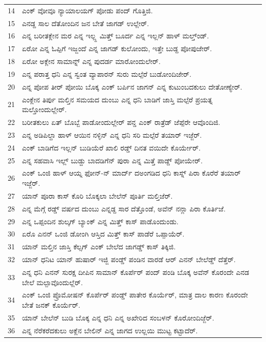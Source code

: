 \documentclass[11pt]{article}
\begin{document}
\begin{longtable}{p{} >{\kannadafont}p{}}
14 & ಎಂಕ್ ವೋವೂ ನ್ಯಾಯಾಲಯಗ್ ಪೋಡು ಪಂದ್ ಗೊತ್ತಿಜಿ. \\
15 & ಎನಡ್ದ ಸಾಲ ದೆತೋಂದಿನ ಜನ ಬೇತೆ ಜಾಗಡ್ ಉಲ್ಲೇರ್. \\
16 & ಎನ್ನ ಬರೀತಕ್ಲೇನ ಮರ ಎನ್ನ ಇಲ್ಲ್ದ ಮಿತ್ತ್ ಬೂರ್ದ ಎನ್ನ ಇಲ್ಲನ್ ಹಾಳ್ ಮಲ್ತ್ಂಡ್. \\
17 & ಏರೋ ಎನ್ನ ಓಪ್ಪಿಗೆ ಇಜ್ಜಂದೆ ಎನ್ನ ಜಾಗಡ್ ಕುಲೋಂದು, ಇತ್ತೇ ಬುಡ್ದ ಪೋಪುಜೇರ್. \\
18 & ಏರೋ ಅಕ್ಲೇನ ಸಾಮಾನ್ನ್ ಎನ್ನ ಪುದರ್ಡ ಮಾರೋಂದುಲೇರ್. \\
19 & ಎನ್ನ ಪರಾತ್ತ ಧನಿ ಎನ್ನ ಸ್ವಂತ ವ್ಯಾಪಾರನ್ ಸುರು ಮಲ್ಪೆರೆ ಬುಡೋಂದಿಜೇರ್. \\
20 & ಎನ್ನ ಪೋಪ ತೀರ್ ಪೋಯಿ ಬೊಕ್ಕ ಎಂಕ್ ಬರ್ಪಿನ ಜಾಗನ್ ಎನ್ನ ಕುಟುಂಬದಕುಲು ದೇತೋಣ್ಯೇರ್. \\
21 & ಎಂಕ್ಲೇನ ತಿರ್ಪು ಮಲ್ತಿನ ಸಮಯದ ದುಂಬು ಎನ್ನ ಧನಿ ಬಾಡಿಗೆ ಜಾಸ್ತಿ ಮಲ್ಪೆರೆ ಪ್ರಯತ್ನ ಮಲ್ತೋಂದುಲ್ಲೇರ್. \\
22 & ಬರೀತಕುಲು ಏತ್ ಬೊಬ್ಬೆ ಪಾಡೋಂದುಲ್ಲೇರ್ ಪನ್ಡ ಎಂಕ್ ರಾತ್ರೆಡ್ ಜೆಪ್ಪೆರೇ ಆವೊಂದಿಜಿ. \\
23 & ಎನ್ನ ಅಡಿಪಿಲ್ದಾ ಹಾಳ್ ಆಯಿನ ನಳ್ಳಿನ್ ಎನ್ನ ಧನಿ ಸರಿ ಮಲ್ಪೆರೆ ತಯಾರ್ ಇಜ್ಜೆರ್. \\
24 & ಎಂಕ್ ಬಾಡಿಗೆದ ಇಲ್ಲನ್ ಬುಡಿಯೆರೆ ಖಾಲಿ ರಡ್ಡ್ ದಿನತ ವಯಿದೇ ಕೊರ್ಯೇರ್. \\
25 & ಎನ್ನ ಸಹವಾಸಿ ಇಲ್ಲ್ ಬುಡ್ದು ಬಾದಡಿಗೆನ್ ಪುರಾ ಎನ್ನ ಮಿತ್ತೆ ಪಾಡ್ದ್ ಪೋಯೇರ್. \\
26 & ಎಂಕ್ ಒಂಜಿ ಹಾಳ್ ಆಯ್ನ ಫೋನ್-ನ್ ಮಾರ್ದ್ ದಅಂಗಡಿದ ಧನಿ ಕಾಸ್ನ್ ಪಿರಾ ಕೊರೆರೆ ತಯಾರ್ ಇಜ್ಜೆರ್. \\
27 & ಯಾನ್ ಪೂರಾ ಕಾಸ್ ಕೊರಿ ಬೊಕ್ಕಲಾ ಬೇಲೆನ್ ಪೂರ್ತಿ ಮಲ್ತಿಜೆರ್. \\
28 & ಎನ್ನ ಮೆಗ್ಗೆ ರಡ್ಡ್ ವರ್ಷದ ದುಂಬು ಎನ್ನಡ್ದ ಸಾರ ದೆತ್ತೊಂಡೆ, ಅವೆನ್ ನನ್ಲಾ ಪಿರಾ ಕೊರ್ತಿಜೆ. \\
29 & ಎನ್ನ ಒಪ್ಪಂದಿನ ಶುಲ್ಕಗ್ ಬ್ಯಾಂಕ್ ಎನ್ನ ಮಿತ್ತ್ ಕಾಸ್ ಪಾಡೊಂದುಂಡು. \\
30 & ಏರೊ ಎನನ್ ಒಂಜಿ ಡೋಂಗಿ ಆಸ್ತಿದ ಮಿತ್ತ್ ಕಾಸ್ ಪಾಡೆರೆ ಒಪ್ಪಾಯೆರ್. \\
31 & ಯಾನ್ ಮಲ್ತಿನ ಜಾಸ್ತಿ ಕೆಲ್ಸಗ್ ಎಂಕ್ ಬೇಲೆದ ಜಾಗಡ್ಡ್ ಕಾಸ್ ತಿಕ್ಕಿಜಿ. \\
32 & ಯಾನ್ ಧನಿಟ ಯಾನ್ ಹುಷಾರ್ ಇಜ್ಜಿ ಪಂಡ್ಡ್ ಪಂಡಿನ ವಾರಡೆ ಆರ್ ಎನನ್ ಬೇಲೆಡ್ಡ್ ದೆತ್ತೆರ್. \\
33 & ಎನ್ನ ಧನಿ ಎನನ್ ಸುರಕ್ಷ ದೀಪಿನ ಸಾಮಾನ್ ಕೊರ್ಪೆರ್ ಪಂದ್ ಪಂಡಿ ಬೊಕ್ಕ ಅವೆನ್ ಕೊರಂದೇ ಎನಡ ಬೇಲೆ ಮಲ್ಪಾವೊಂದುಲ್ಲೆರ್. \\
34 & ಎಂಕ್ ಒಂಜಿ ಪ್ರೊಮೋಷನ್ ಕೊರ್ಪೆರ್ ಪಂಡ್ಡ್ ಪಾತೇರ ಕೊರ್ಯೆರ್, ಮಾತ್ರ ದಾಲ ಕಾರಣ ಕೊರಂದೇ ಬೇತೆ ಜನಕ್ ಕೊರ್ಯೆರ್. \\
35 & ಯಾನ್ ಬೇಲೆನ್ ಬುಡಿ ಬೊಕ್ಕ ಎನ್ನ ಧನಿ ಎನ್ನ ಅಖೇರಿದ ಸಂಬಳನ್ ಕೊರೋಂದಿಜ್ಜೆರ್. \\
36 & ಎನ್ನ ನೆರೆಕರೆದಕುಲು ಅಕ್ಲೆನ ಬೇಲಿನ್ ಎನ್ನ ಜಾಗದ ಉಲ್ಲಯಿ ಮುಟ್ಟ ಕಟ್ಟಾದೆರ್. \\

\end{longtable}
\end{document}
